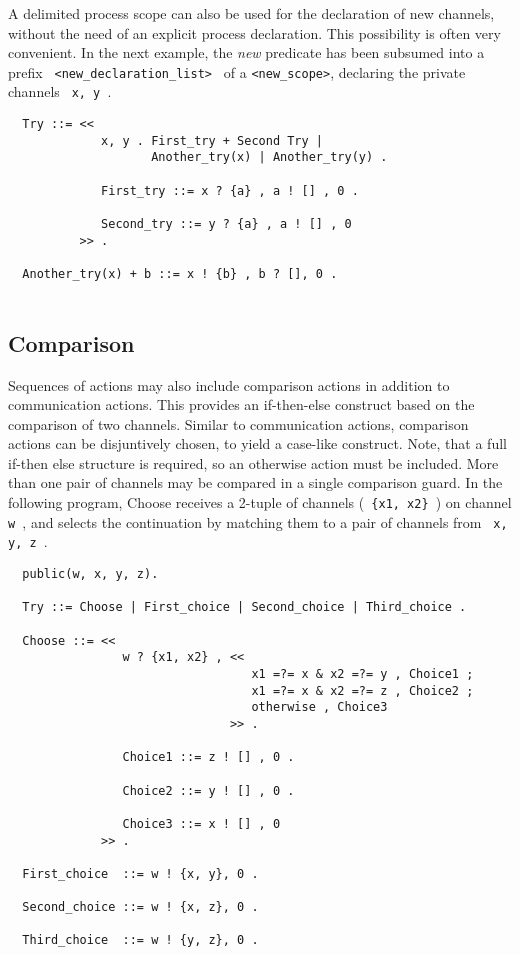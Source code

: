 A delimited process scope can also be used for the declaration of
new channels, without the need of an explicit process declaration.
This possibility is often very convenient. In the next example, the
{\em new} predicate has been subsumed into a prefix
\verb+ <new_declaration_list> +
of a \verb+<new_scope>+, declaring the private channels \verb+ x, y +.

\begin{verbatim}
  Try ::= <<
             x, y . First_try + Second Try |
                    Another_try(x) | Another_try(y) .

             First_try ::= x ? {a} , a ! [] , 0 .

             Second_try ::= y ? {a} , a ! [] , 0 
          >> .

  Another_try(x) + b ::= x ! {b} , b ? [], 0 .
 
\end{verbatim}

\subsection{Comparison}

Sequences of actions may also include comparison actions in
addition to communication actions. This provides an if-then-else construct
based on the comparison of two channels. Similar to communication
actions, comparison actions can be disjuntively chosen, to yield a
case-like construct. Note, that a full if-then else structure is
required, so an otherwise action must be included. More than one pair
of channels may be compared in a single comparison guard. In the following
program, Choose receives a 2-tuple of channels (\verb+ {x1, x2} +)
on channel \verb+ w +, and selects the continuation by matching them
to a pair of channels from \verb+ x, y, z +.

\begin{verbatim}
  public(w, x, y, z).

  Try ::= Choose | First_choice | Second_choice | Third_choice .

  Choose ::= <<
                w ? {x1, x2} , <<
                                  x1 =?= x & x2 =?= y , Choice1 ;
                                  x1 =?= x & x2 =?= z , Choice2 ;
                                  otherwise , Choice3
                               >> .

                Choice1 ::= z ! [] , 0 .

                Choice2 ::= y ! [] , 0 . 

                Choice3 ::= x ! [] , 0
             >> .
  
  First_choice  ::= w ! {x, y}, 0 .
          
  Second_choice ::= w ! {x, z}, 0 .

  Third_choice  ::= w ! {y, z}, 0 .  
 
\end{verbatim}


